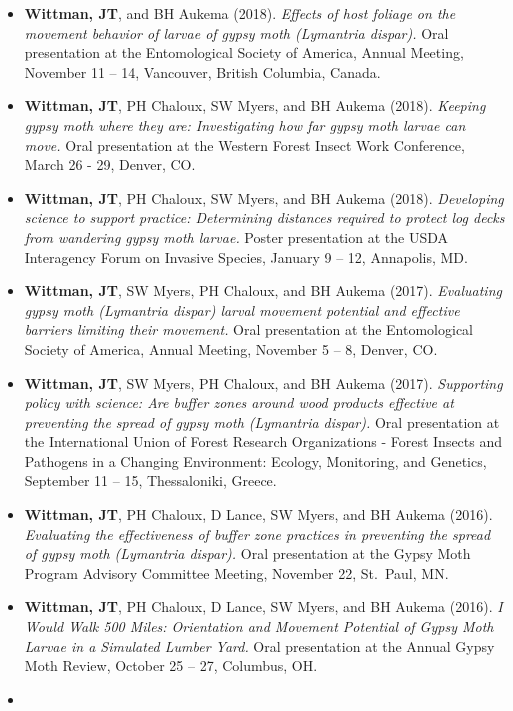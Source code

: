 \documentclass[11pt, a4paper]{awesome-cv}
\providecommand{\tightlist}{%
	\setlength{\itemsep}{0pt}\setlength{\parskip}{0pt}}
\begin{document}
\begin{itemize}
\tightlist
\item
  \textbf{Wittman, JT}, and BH Aukema (2018). \emph{Effects of host
  foliage on the movement behavior of larvae of gypsy moth (Lymantria
  dispar).} Oral presentation at the Entomological Society of America,
  Annual Meeting, November 11 -- 14, Vancouver, British Columbia,
  Canada.
\item
  \textbf{Wittman, JT}, PH Chaloux, SW Myers, and BH Aukema (2018).
  \emph{Keeping gypsy moth where they are: Investigating how far gypsy
  moth larvae can move.} Oral presentation at the Western Forest Insect
  Work Conference, March 26 - 29, Denver, CO.
\item
  \textbf{Wittman, JT}, PH Chaloux, SW Myers, and BH Aukema (2018).
  \emph{Developing science to support practice: Determining distances
  required to protect log decks from wandering gypsy moth larvae.}
  Poster presentation at the USDA Interagency Forum on Invasive Species,
  January 9 -- 12, Annapolis, MD.
\item
  \textbf{Wittman, JT}, SW Myers, PH Chaloux, and BH Aukema (2017).
  \emph{Evaluating gypsy moth (Lymantria dispar) larval movement
  potential and effective barriers limiting their movement.} Oral
  presentation at the Entomological Society of America, Annual Meeting,
  November 5 -- 8, Denver, CO.
\item
  \textbf{Wittman, JT}, SW Myers, PH Chaloux, and BH Aukema (2017).
  \emph{Supporting policy with science: Are buffer zones around wood
  products effective at preventing the spread of gypsy moth (Lymantria
  dispar).} Oral presentation at the International Union of Forest
  Research Organizations - Forest Insects and Pathogens in a Changing
  Environment: Ecology, Monitoring, and Genetics, September 11 -- 15,
  Thessaloniki, Greece.
\item
  \textbf{Wittman, JT}, PH Chaloux, D Lance, SW Myers, and BH Aukema
  (2016). \emph{Evaluating the effectiveness of buffer zone practices in
  preventing the spread of gypsy moth (Lymantria dispar).} Oral
  presentation at the Gypsy Moth Program Advisory Committee Meeting,
  November 22, St.~Paul, MN.
\item
  \textbf{Wittman, JT}, PH Chaloux, D Lance, SW Myers, and BH Aukema
  (2016). \emph{I Would Walk 500 Miles: Orientation and Movement
  Potential of Gypsy Moth Larvae in a Simulated Lumber Yard.} Oral
  presentation at the Annual Gypsy Moth Review, October 25 -- 27,
  Columbus, OH.
\item

\end{itemize}
\end{document}

